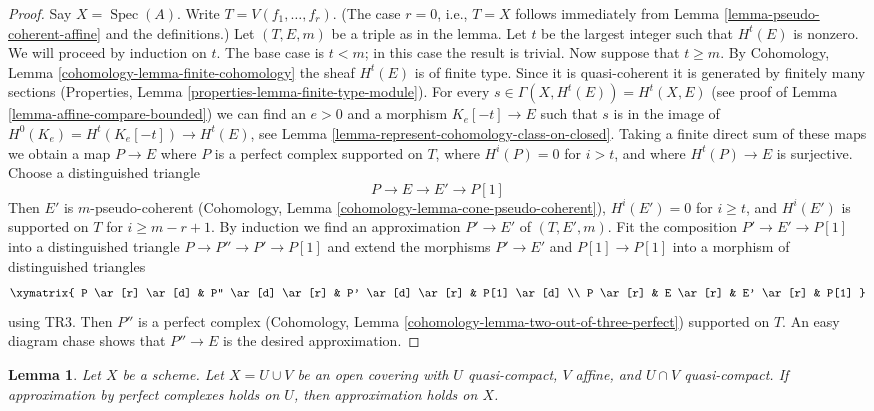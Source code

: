\documentclass{stacks-project}
\theoremstyle{plain}
\newtheorem{lemma}[subsection]{Lemma}
\theoremstyle{definition}
\theoremstyle{remark}
\numberwithin{equation}{subsection}
\def\Spec{\mathop{\mathrm{Spec}}}
\begin{document}
\begin{proof}
Say $X = \Spec(A)$. Write $T = V(f_1, \ldots, f_r)$.
(The case $r = 0$, i.e., $T = X$ follows immediately from
Lemma \ref{lemma-pseudo-coherent-affine} and the definitions.)
Let $(T, E, m)$ be a triple as in the lemma.
Let $t$ be the largest integer such that $H^t(E)$ is nonzero.
We will proceed by induction on $t$. The base case is $t < m$; in
this case the result is trivial. Now suppose that $t \geq m$. By
Cohomology, Lemma \ref{cohomology-lemma-finite-cohomology}
the sheaf $H^t(E)$ is of finite type. Since it is quasi-coherent
it is generated by finitely many sections
(Properties, Lemma \ref{properties-lemma-finite-type-module}).
For every $s \in \Gamma(X, H^t(E)) = H^t(X, E)$
(see proof of Lemma \ref{lemma-affine-compare-bounded})
we can find an $e > 0$ and a morphism $K_e[-t] \to E$
such that $s$ is in the image of
$H^0(K_e) = H^t(K_e[-t]) \to H^t(E)$, see
Lemma \ref{lemma-represent-cohomology-class-on-closed}.
Taking a finite direct sum of these maps we obtain a map
$P \to E$ where $P$ is a perfect complex supported on $T$,
where $H^i(P) = 0$ for $i > t$, and where $H^t(P) \to E$ is
surjective. Choose a distinguished triangle
$$
P \to E \to E' \to P[1]
$$
Then $E'$ is $m$-pseudo-coherent
(Cohomology, Lemma \ref{cohomology-lemma-cone-pseudo-coherent}),
$H^i(E') = 0$ for $i \geq t$, and
$H^i(E')$ is supported on $T$ for $i \geq m - r + 1$.
By induction we find an approximation $P' \to E'$
of $(T, E', m)$. Fit the composition $P' \to E' \to P[1]$
into a distinguished triangle $P \to P'' \to P' \to P[1]$
and extend the morphisms $P' \to E'$ and $P[1] \to P[1]$ into
a morphism of distinguished triangles
$$
\xymatrix{
P \ar[r] \ar[d] & P'' \ar[d] \ar[r] & P' \ar[d] \ar[r] & P[1] \ar[d] \\
P \ar[r] &  E \ar[r] & E' \ar[r] & P[1]
}
$$
using TR3. Then $P''$ is a perfect complex
(Cohomology, Lemma \ref{cohomology-lemma-two-out-of-three-perfect})
supported on $T$.
An easy diagram chase shows that $P'' \to E$ is the desired
approximation.
\end{proof}

\begin{lemma}
\label{lemma-induction-step}
Let $X$ be a scheme. Let $X = U \cup V$ be an open covering
with $U$ quasi-compact, $V$ affine, and $U \cap V$ quasi-compact.
If approximation by perfect complexes holds on $U$,
then approximation holds on $X$.
\end{lemma}
\end{document}
